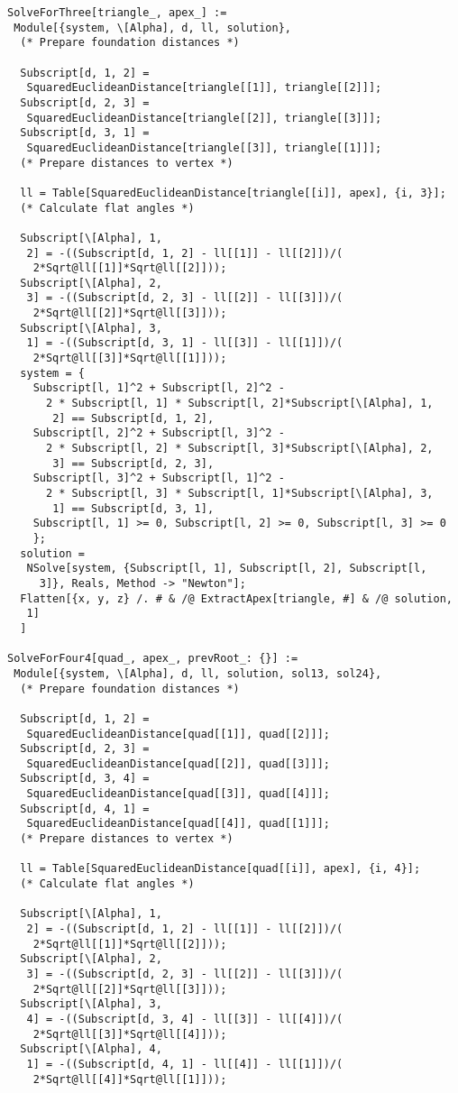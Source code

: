 \documentclass[../main.tex]{subfiles}
\begin{document}
\begin{lstlisting}
SolveForThree[triangle_, apex_] :=
 Module[{system, \[Alpha], d, ll, solution},
  (* Prepare foundation distances *)

  Subscript[d, 1, 2] =
   SquaredEuclideanDistance[triangle[[1]], triangle[[2]]];
  Subscript[d, 2, 3] =
   SquaredEuclideanDistance[triangle[[2]], triangle[[3]]];
  Subscript[d, 3, 1] =
   SquaredEuclideanDistance[triangle[[3]], triangle[[1]]];
  (* Prepare distances to vertex *)

  ll = Table[SquaredEuclideanDistance[triangle[[i]], apex], {i, 3}];
  (* Calculate flat angles *)

  Subscript[\[Alpha], 1,
   2] = -((Subscript[d, 1, 2] - ll[[1]] - ll[[2]])/(
    2*Sqrt@ll[[1]]*Sqrt@ll[[2]]));
  Subscript[\[Alpha], 2,
   3] = -((Subscript[d, 2, 3] - ll[[2]] - ll[[3]])/(
    2*Sqrt@ll[[2]]*Sqrt@ll[[3]]));
  Subscript[\[Alpha], 3,
   1] = -((Subscript[d, 3, 1] - ll[[3]] - ll[[1]])/(
    2*Sqrt@ll[[3]]*Sqrt@ll[[1]]));
  system = {
    Subscript[l, 1]^2 + Subscript[l, 2]^2 -
      2 * Subscript[l, 1] * Subscript[l, 2]*Subscript[\[Alpha], 1,
       2] == Subscript[d, 1, 2],
    Subscript[l, 2]^2 + Subscript[l, 3]^2 -
      2 * Subscript[l, 2] * Subscript[l, 3]*Subscript[\[Alpha], 2,
       3] == Subscript[d, 2, 3],
    Subscript[l, 3]^2 + Subscript[l, 1]^2 -
      2 * Subscript[l, 3] * Subscript[l, 1]*Subscript[\[Alpha], 3,
       1] == Subscript[d, 3, 1],
    Subscript[l, 1] >= 0, Subscript[l, 2] >= 0, Subscript[l, 3] >= 0
    };
  solution =
   NSolve[system, {Subscript[l, 1], Subscript[l, 2], Subscript[l,
     3]}, Reals, Method -> "Newton"];
  Flatten[{x, y, z} /. # & /@ ExtractApex[triangle, #] & /@ solution,
   1]
  ]

SolveForFour4[quad_, apex_, prevRoot_: {}] :=
 Module[{system, \[Alpha], d, ll, solution, sol13, sol24},
  (* Prepare foundation distances *)

  Subscript[d, 1, 2] =
   SquaredEuclideanDistance[quad[[1]], quad[[2]]];
  Subscript[d, 2, 3] =
   SquaredEuclideanDistance[quad[[2]], quad[[3]]];
  Subscript[d, 3, 4] =
   SquaredEuclideanDistance[quad[[3]], quad[[4]]];
  Subscript[d, 4, 1] =
   SquaredEuclideanDistance[quad[[4]], quad[[1]]];
  (* Prepare distances to vertex *)

  ll = Table[SquaredEuclideanDistance[quad[[i]], apex], {i, 4}];
  (* Calculate flat angles *)

  Subscript[\[Alpha], 1,
   2] = -((Subscript[d, 1, 2] - ll[[1]] - ll[[2]])/(
    2*Sqrt@ll[[1]]*Sqrt@ll[[2]]));
  Subscript[\[Alpha], 2,
   3] = -((Subscript[d, 2, 3] - ll[[2]] - ll[[3]])/(
    2*Sqrt@ll[[2]]*Sqrt@ll[[3]]));
  Subscript[\[Alpha], 3,
   4] = -((Subscript[d, 3, 4] - ll[[3]] - ll[[4]])/(
    2*Sqrt@ll[[3]]*Sqrt@ll[[4]]));
  Subscript[\[Alpha], 4,
   1] = -((Subscript[d, 4, 1] - ll[[4]] - ll[[1]])/(
    2*Sqrt@ll[[4]]*Sqrt@ll[[1]]));


\end{lstlisting}
\end{document}
